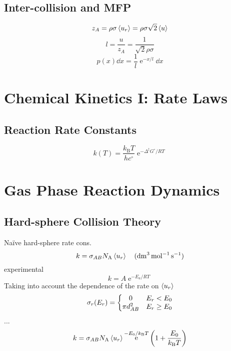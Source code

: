 \documentclass[a4paper]{article}
\DeclareMathOperator{\e}{\mathrm{e}}
\newcommand{\NA}{N_\mathrm{A}}
\newcommand{\kB}{k_\mathrm{B}}
\numberwithin{equation}{section}
\begin{document}
\subsection{}
\subsection{Inter-collision and MFP}
\begin{equation}\label{key}
z_A  = \rho \sigma \ev{u_r} = \rho\sigma \sqrt{2}\ev{u}
\end{equation}
\begin{equation}\label{key}
l = \dfrac{u}{z_A} = \dfrac{1}{\sqrt{2}\rho\sigma}
\end{equation}
\begin{equation}\label{key}
p(x)\dd x = \dfrac{1}{l}\e^{-x/l}\dd x
\end{equation}








\section{Chemical Kinetics I: Rate Laws}
\setcounter{subsection}{7}
\subsection{Reaction Rate Constants}
\begin{equation}\label{key}
k(T) = \dfrac{\kB T}{h c^\circ}\e^{-\Delta^\ddagger G^\circ/RT}
\end{equation}

\section{}


\section{Gas Phase Reaction Dynamics}
\subsection{Hard-sphere Collision Theory}
Na\"ive hard-sphere rate cons.
\begin{equation}\label{key}
k = \sigma_{AB} \NA \ev{u_r}     \quad (\si{dm^3.mol^{-1}.s^{-1}})
\end{equation}
experimental
\begin{equation}\label{key}
k = A\e^{-E_a/RT}
\end{equation}
Taking into account the dependence of the rate on $ \ev{u_r} $\\
\begin{equation}\label{key}
\sigma_r(E_r) = \left\{
\mqty{0            & E_r<E_0\\
	  \pi d_{AB}^2 & E_r \geq E_0}\right.
\end{equation}
...
\begin{equation}\label{key}
k = \sigma_{AB}\NA \ev{u_r} \e^{-E_0/\kB T}\qty(1 + \dfrac{E_0}{\kB T})
\end{equation}
\end{document}
